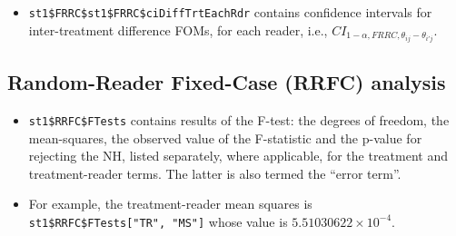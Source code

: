 \documentclass[
]{book}
\newenvironment{Shaded}{\begin{snugshade}}{\end{snugshade}}
\newcommand{\CommentTok}[1]{\textcolor[rgb]{0.56,0.35,0.01}{\textit{#1}}}
\newcommand{\DataTypeTok}[1]{\textcolor[rgb]{0.13,0.29,0.53}{#1}}
\newcommand{\DecValTok}[1]{\textcolor[rgb]{0.00,0.00,0.81}{#1}}
\newcommand{\KeywordTok}[1]{\textcolor[rgb]{0.13,0.29,0.53}{\textbf{#1}}}
\newcommand{\NormalTok}[1]{#1}
\newcommand{\OperatorTok}[1]{\textcolor[rgb]{0.81,0.36,0.00}{\textbf{#1}}}
\providecommand{\tightlist}{%
  \setlength{\itemsep}{0pt}\setlength{\parskip}{0pt}}
\begin{document}
\begin{itemize}
\tightlist
\item
  \texttt{st1\$FRRC\$st1\$FRRC\$ciDiffTrtEachRdr} contains confidence intervals for inter-treatment difference FOMs, for each reader, i.e., \(CI_{1-\alpha,FRRC,\theta_{i j} - \theta_{i' j}}\).
\end{itemize}

\hypertarget{ORApplications-RRFC-dataset02-RJafroc}{%
\subsection{Random-Reader Fixed-Case (RRFC) analysis}\label{ORApplications-RRFC-dataset02-RJafroc}}

\begin{Shaded}
\end{Shaded}

\begin{itemize}
\tightlist
\item
  \texttt{st1\$RRFC\$FTests} contains results of the F-test: the degrees of freedom, the mean-squares, the observed value of the F-statistic and the p-value for rejecting the NH, listed separately, where applicable, for the treatment and treatment-reader terms. The latter is also termed the ``error term''.
\item
  For example, the treatment-reader mean squares is \texttt{st1\$RRFC\$FTests{[}"TR",\ "MS"{]}} whose value is \ensuremath{5.51030622\times 10^{-4}}.
\end{itemize}

\begin{Shaded}
\end{Shaded}
\end{document}
